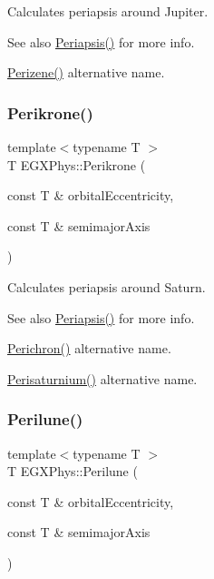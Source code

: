 Calculates periapsis around Jupiter. 

\begin{DoxySeeAlso}{See also}
\mbox{\hyperlink{group___e_g_x_phys-_periapsis_ga4414ac75539371ec874a3d25cad6c9fe}{Periapsis()}} for more info. 

\mbox{\hyperlink{group___e_g_x_phys-_periapsis_ga0523c65b7fc26e675388b2c3d38aa00b}{Perizene()}} alternative name. 
\end{DoxySeeAlso}
\mbox{\label{group___e_g_x_phys-_periapsis_gaa56f74c44a3583b8f0d13b821c1d7422}} 
\subsubsection{\texorpdfstring{Perikrone()}{Perikrone()}}
{\footnotesize\ttfamily template$<$typename T $>$ \\
T E\+G\+X\+Phys\+::\+Perikrone (\begin{DoxyParamCaption}\item[{const T \&}]{orbital\+Eccentricity,  }\item[{const T \&}]{semimajor\+Axis }\end{DoxyParamCaption})}



Calculates periapsis around Saturn. 

\begin{DoxySeeAlso}{See also}
\mbox{\hyperlink{group___e_g_x_phys-_periapsis_ga4414ac75539371ec874a3d25cad6c9fe}{Periapsis()}} for more info. 

\mbox{\hyperlink{group___e_g_x_phys-_periapsis_ga12b5e99aa2e3e7031ef6ce93060cf516}{Perichron()}} alternative name. 

\mbox{\hyperlink{group___e_g_x_phys-_periapsis_ga60a50d09d29ebe47cbbfc125c2ea42bf}{Perisaturnium()}} alternative name. 
\end{DoxySeeAlso}
\mbox{\label{group___e_g_x_phys-_periapsis_ga2cc7ab05e18d32c94d8d74972e032793}} 
\subsubsection{\texorpdfstring{Perilune()}{Perilune()}}
{\footnotesize\ttfamily template$<$typename T $>$ \\
T E\+G\+X\+Phys\+::\+Perilune (\begin{DoxyParamCaption}\item[{const T \&}]{orbital\+Eccentricity,  }\item[{const T \&}]{semimajor\+Axis }\end{DoxyParamCaption})}




